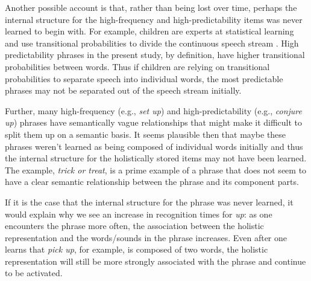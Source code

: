 \documentclass[
  authoryear,
  preprint,
  1p,
  onecolumn]{elsarticle}
\begin{document}
Another possible account is that, rather than being lost over time,
perhaps the internal structure for the high-frequency and
high-predictability items was never learned to begin with. For example,
children are experts at statistical learning and use transitional
probabilities to divide the continuous speech stream
\citep{saffran1996}. High predictability phrases in the present study,
by definition, have higher transitional probabilities between words.
Thus if children are relying on transitional probabilities to separate
speech into individual words, the most predictable phrases may not be
separated out of the speech stream initially.

Further, many high-frequency (e.g., \emph{set up}) and
high-predictability (e.g., \emph{conjure up}) phrases have semantically
vague relationships that might make it difficult to split them up on a
semantic basis. It seems plausible then that maybe these phrases weren't
learned as being composed of individual words initially and thus the
internal structure for the holistically stored items may not have been
learned. The example, \emph{trick or treat}, is a prime example of a
phrase that does not seem to have a clear semantic relationship between
the phrase and its component parts.

If it is the case that the internal structure for the phrase was never
learned, it would explain why we see an increase in recognition times
for \emph{up}: as one encounters the phrase more often, the association
between the holistic representation and the words/sounds in the phrase
increases. Even after one learns that \emph{pick up}, for example, is
composed of two words, the holistic representation will still be more
strongly associated with the phrase and continue to be activated.
\end{document}
